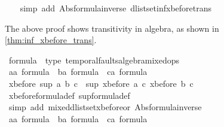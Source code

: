 \begin{isabellebody}
\ \ \isamarkupfalse%
\ {\isacharparenleft}simp\ add{\isacharcolon}\ Abs{\isacharunderscore}formula{\isacharunderscore}inverse\ dlistset{\isacharunderscore}inf{\isacharunderscore}xbefore{\isacharunderscore}trans{\isacharparenright}\isanewline
{}\isamarkupfalse%
%
\endisatagproof
{\isafoldproof}%
%
\isadelimproof
%
\endisadelimproof
%
\begin{isamarkuptext}%
The above proof shows transitivity in \ac{algebra}, as shown in \cref{thm:inf_xbefore_trans}.%
\end{isamarkuptext}\isamarkuptrue%
\isamarkupfalse%
%
\isamarkuptrue%
\isamarkupfalse%
\ formula\ {\isacharcolon}{\isacharcolon}\ {\isacharparenleft}type{\isacharparenright}\ temporal{\isacharunderscore}faults{\isacharunderscore}algebra{\isacharunderscore}mixed{\isacharunderscore}ops\isanewline
{}\isanewline
{}\isamarkupfalse%
%
\isadelimproof
\ %
\endisadelimproof
%
\isatagproof
{}\isamarkupfalse%
\isanewline
\ \ \isamarkupfalse%
\ a{\isacharcolon}{\isacharcolon}{\isachardoublequoteopen}{\isacharprime}a\ formula{\isachardoublequoteclose}\ \ b{\isacharcolon}{\isacharcolon}{\isachardoublequoteopen}{\isacharprime}a\ formula{\isachardoublequoteclose}\ \ c{\isacharcolon}{\isacharcolon}{\isachardoublequoteopen}{\isacharprime}a\ formula{\isachardoublequoteclose}\isanewline
\ \ \isamarkupfalse%
\ {\isachardoublequoteopen}xbefore\ {\isacharparenleft}sup\ a\ b{\isacharparenright}\ c\ {\isacharequal}\ sup\ {\isacharparenleft}xbefore\ a\ c{\isacharparenright}\ {\isacharparenleft}xbefore\ b\ c{\isacharparenright}{\isachardoublequoteclose}\isanewline
\ \ \isamarkupfalse%
\ xbefore{\isacharunderscore}formula{\isacharunderscore}def\ sup{\isacharunderscore}formula{\isacharunderscore}def\isanewline
\ \ \isamarkupfalse%
\ {\isacharparenleft}simp\ add{\isacharcolon}\ mixed{\isacharunderscore}dlistset{\isacharunderscore}xbefore{\isacharunderscore}or{}\ Abs{\isacharunderscore}formula{\isacharunderscore}inverse{\isacharparenright}\isanewline
\ \ \isamarkupfalse%
\isanewline
\ \ \isamarkupfalse%
\ a{\isacharcolon}{\isacharcolon}{\isachardoublequoteopen}{\isacharprime}a\ formula{\isachardoublequoteclose}\ \ b{\isacharcolon}{\isacharcolon}{\isachardoublequoteopen}{\isacharprime}a\ formula{\isachardoublequoteclose}\ \ c{\isacharcolon}{\isacharcolon}{\isachardoublequoteopen}{\isacharprime}a\ formula{\isachardoublequoteclose}\isanewline

\end{isabellebody}
